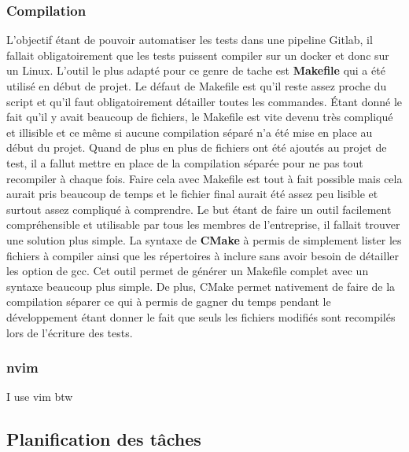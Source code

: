 \documentclass[a4paper]{article}
\begin{document}
\subsubsection{Compilation}

L'objectif étant de pouvoir automatiser les tests dans une pipeline Gitlab, il
fallait obligatoirement que les tests puissent compiler sur un docker et donc
sur un Linux. L'outil le plus adapté pour ce genre de tache est
\textbf{Makefile} qui a été utilisé en début de projet. Le défaut de Makefile
est qu'il reste assez proche du script et qu'il faut obligatoirement détailler
toutes les commandes. Étant donné le fait qu'il y avait beaucoup de fichiers, le
Makefile est vite devenu très compliqué et illisible et ce même si aucune
compilation séparé n'a été mise en place au début du projet. Quand de plus en
plus de fichiers ont été ajoutés au projet de test, il a fallut mettre en place
de la compilation séparée pour ne pas tout recompiler à chaque fois. Faire cela
avec Makefile est tout à fait possible mais cela aurait pris beaucoup de temps     %
et le fichier final aurait été assez peu lisible et surtout assez compliqué à
comprendre. Le but étant de faire un outil facilement compréhensible et
utilisable par tous les membres de l'entreprise, il fallait trouver une solution
plus simple. La syntaxe de \textbf{CMake} à permis de simplement lister les
fichiers à compiler ainsi que les répertoires à inclure sans avoir besoin de
détailler les option de gcc. Cet outil permet de générer un Makefile complet
avec un syntaxe beaucoup plus simple. De plus, CMake permet nativement de faire
de la compilation séparer ce qui à permis de gagner du temps pendant le
développement étant donner le fait que seuls les fichiers modifiés sont
recompilés lors de l'écriture des tests.

\subsubsection{nvim}

I use vim btw


\subsection{Planification des tâches}
\end{document}
